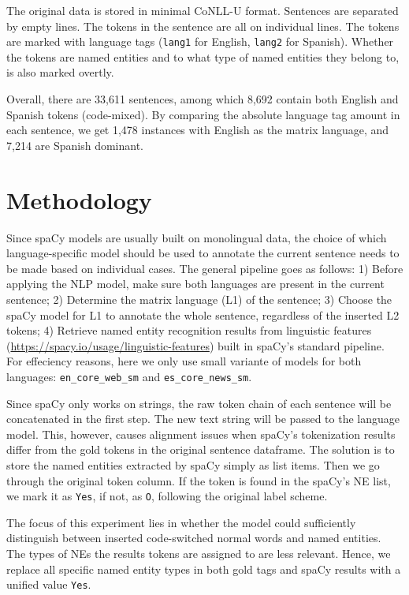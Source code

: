 \documentclass[11pt]{article}
\begin{document}
The original data is stored in minimal CoNLL-U format. Sentences are separated by empty lines. The tokens in the sentence are all on individual lines. The tokens are marked with language tags (\texttt{lang1} for English, \texttt{lang2} for Spanish). Whether the tokens are named entities and to what type of named entities they belong to, is also marked overtly.

Overall, there are 33,611 sentences, among which 8,692 contain both English and Spanish tokens (code-mixed). By comparing the absolute language tag amount in each sentence, we get 1,478 instances with English as the matrix language, and 7,214 are Spanish dominant.


\section{Methodology}

Since spaCy models are usually built on monolingual data, the choice of which language-specific model should be used to annotate the current sentence needs to be made based on individual cases. The general pipeline goes as follows: 1) Before applying the NLP model, make sure both languages are present in the current sentence; 2) Determine the matrix language (L1) of the sentence; 3) Choose the spaCy model for L1 to annotate the whole sentence, regardless of the inserted L2 tokens; 4) Retrieve named entity recognition results from linguistic features (\href{https://spacy.io/usage/linguistic-features}{https://spacy.io/usage/linguistic-features}) built in spaCy's standard pipeline. For effeciency reasons, here we only use small variante of models for both languages: \texttt{en\_core\_web\_sm} and \texttt{es\_core\_news\_sm}.

Since spaCy only works on strings, the raw token chain of each sentence will be concatenated in the first step. The new text string will be passed to the language model. This, however, causes alignment issues when spaCy's tokenization results differ from the gold tokens in the original sentence dataframe. The solution is to store the named entities extracted by spaCy simply as list items. Then we go through the original token column. If the token is found in the spaCy's NE list, we mark it as \texttt{Yes}, if not, as \texttt{O}, following the original label scheme.

The focus of this experiment lies in whether the model could sufficiently distinguish between inserted code-switched normal words and named entities. The types of NEs the results tokens are assigned to are less relevant. Hence, we replace all specific named entity types in both gold tags and spaCy results with a unified value \texttt{Yes}. 
\end{document}
